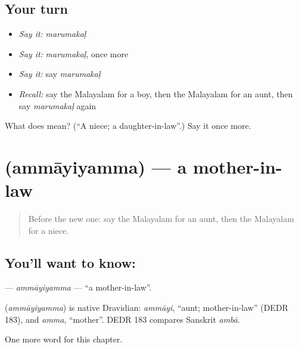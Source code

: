 \subsection*{Your turn}
\begin{itemize}
\raggedright
  \item \emph{Say it:} \emph{marumakaḷ}
  \item \emph{Say it:} \emph{marumakaḷ}, once more
  \item \emph{Say it:} say \emph{marumakaḷ}
  \item \emph{Recall:} say the Malayalam for a boy, then the Malayalam for an aunt, then say \emph{marumakaḷ} again
\end{itemize}

\begin{tcolorbox}[breakable,colback=teal!4,colframe=teal!35!black,title={Before you move on}]
What does  mean? (\textquotedblleft{}A niece; a daughter-in-law\textquotedblright{}.) Say it once more.
\end{tcolorbox}
\section[\texorpdfstring{\ml{അമ്മായിയമ്മ} (ammāyiyamma)}{അമ്മായിയമ്മ (ammāyiyamma)}]{ (ammāyiyamma) — a mother-in-law}

\label{lesson:ML-C289-ammayiyamma}



\begin{quote}
Before the new one: say the Malayalam for an aunt, then the Malayalam for a niece.
\end{quote}

\subsection*{You'll want to know: }
\textbf{} — \emph{ammāyiyamma} — \textquotedblleft{}a mother-in-law\textquotedblright{}.

\begin{cousinweb}
\textbf{} (\emph{ammāyiyamma}) is native Dravidian: \emph{ammāyi}, \textquotedblleft{}aunt; mother-in-law\textquotedblright{} (DEDR 183), and \emph{amma}, \textquotedblleft{}mother\textquotedblright{}. DEDR 183 compares Sanskrit \emph{ambā}.
\end{cousinweb}

\begin{grammarlens}[title={What you've built}]
One more word for this chapter.
\end{grammarlens}

